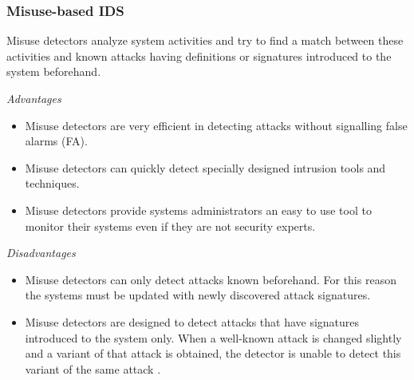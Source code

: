 \documentclass[12pt]{article}
\theoremstyle{definition}
\begin{document}
			\subsubsection{Misuse-based IDS}
			Misuse detectors analyze system activities and try to find a match between these activities and known attacks having
			definitions or signatures introduced to the system beforehand\cite{Chowdhury2016}.
			
			\textit{Advantages}
			\begin{itemize}
				
				\item Misuse detectors are very efficient in detecting attacks without signalling false alarms (FA).
				
				\item Misuse detectors can quickly detect specially designed intrusion tools and techniques.
				\item Misuse detectors provide systems administrators an easy to use tool to monitor their systems even if they are not security
				experts.
			\end{itemize}
			
			\textit{Disadvantages}
			\begin{itemize}
				\item Misuse detectors can only detect attacks known beforehand. For this reason the systems must be updated with newly discovered attack signatures.
				
				\item Misuse detectors are designed to detect attacks that have signatures introduced to the system only. When a well-known attack is changed slightly and a variant of that attack is obtained, the detector is unable to detect this variant of the same attack \cite{Gamarra2016}.
			\end{itemize}
		
\end{document}
